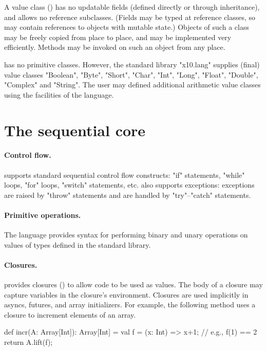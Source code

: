 A value class () has no updatable fields (defined
directly or through inheritance), and allows no reference
subclasses. (Fields may be typed at reference classes, so may contain
references to objects with mutable state.) Objects of such a class may
be freely copied from place to place, and may be implemented very
efficiently. Methods may be invoked on such an object from any place.

\Xten{} has no primitive classes. However, the standard library
\xcd"x10.lang" supplies (final) value classes \xcd"Boolean", \xcd"Byte",
\xcd"Short", \xcd"Char", \xcd"Int", \xcd"Long", \xcd"Float",
\xcd"Double", \xcd"Complex" and \xcd"String". The user may defined
additional arithmetic value classes using the facilities of the
language.

\section{The sequential core}

\paragraph{Control flow.}  \Xten{} supports standard sequential control flow
constructs: \xcd"if" statements, \xcd"while" loops, \xcd"for" loops,
\xcd"switch" statements, etc.  \Xten{} also supports exceptions: exceptions are
raised by \xcd"throw" statements and are handled by \xcd"try"--\xcd"catch"
statements.

\paragraph{Primitive operations.}  The language provides syntax for performing
binary and unary operations on values of types defined in the standard library.

\paragraph{Closures.}
\Xten{} provides closures () to allow code to be used
as values.  The body of a closure may capture variables in the closure's
environment.  Closures are used implicitly in asyncs, futures, and array
initializers.
%
For example, the following method uses a closure to increment
elements of an array.
\begin{xten}
def incr(A: Array[Int]): Array[Int] = {
    val f = (x: Int) => x+1; // e.g., f(1) == 2
    return A.lift(f);
}
\end{xten}


